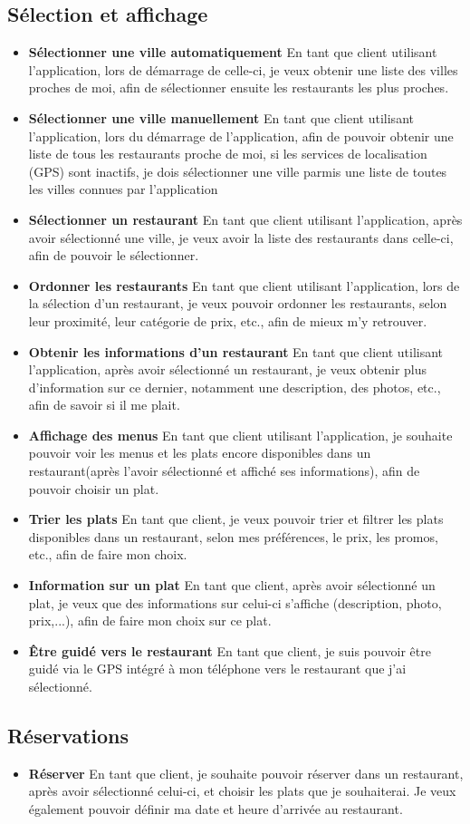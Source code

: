 \documentclass[10pt,a4paper]{article}
\begin{document}
\subsection{Sélection et affichage}
\begin{itemize}
\item \textbf{Sélectionner une ville automatiquement} En tant que client utilisant l'application, lors de démarrage de celle-ci, je veux obtenir une liste des villes proches de moi, afin de sélectionner ensuite les restaurants les plus proches.
\item \textbf{Sélectionner une ville manuellement} En tant que client utilisant l'application, lors du démarrage de l'application, afin de pouvoir obtenir une liste de tous les restaurants proche de moi, si les services de localisation (GPS) sont inactifs, je dois sélectionner une ville parmis une liste de toutes les villes connues par l'application
\item \textbf{Sélectionner un restaurant} En tant que client utilisant l'application, après avoir sélectionné une ville, je veux avoir la liste des restaurants dans celle-ci, afin de pouvoir le sélectionner.
\item \textbf{Ordonner les restaurants} En tant que client utilisant l'application, lors de la sélection d'un restaurant, je veux pouvoir ordonner les restaurants, selon leur proximité, leur catégorie de prix, etc., afin de mieux m'y retrouver.
\item \textbf{Obtenir les informations d'un restaurant} En tant que client utilisant l'application, après avoir sélectionné un restaurant, je veux obtenir plus d'information sur ce dernier, notamment une description, des photos, etc., afin de savoir si il me plait.
\item \textbf{Affichage des menus} En tant que client utilisant l'application, je souhaite pouvoir voir les menus et les plats encore disponibles dans un restaurant(après l'avoir sélectionné et affiché ses informations), afin de pouvoir choisir un plat.
\item \textbf{Trier les plats} En tant que client, je veux pouvoir trier et filtrer les plats disponibles dans un restaurant, selon mes préférences, le prix, les promos, etc., afin de faire mon choix.
\item \textbf{Information sur un plat} En tant que client, après avoir sélectionné un plat, je veux que des informations sur celui-ci s'affiche (description, photo, prix,...), afin de faire mon choix sur ce plat.
\item \textbf{Être guidé vers le restaurant} En tant que client, je suis pouvoir être guidé via le GPS intégré à mon téléphone vers le restaurant que j'ai sélectionné.
\end{itemize}
\subsection{Réservations}
\begin{itemize}
\item \textbf{Réserver} En tant que client, je souhaite pouvoir réserver dans un restaurant, après avoir sélectionné celui-ci, et choisir les plats que je souhaiterai. Je veux également pouvoir définir ma date et heure d'arrivée au restaurant.
\end{itemize}
\end{document}
